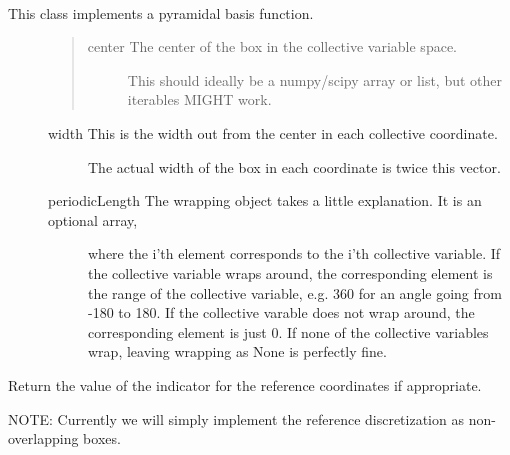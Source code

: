 \documentclass[letterpaper,10pt,english]{sphinxmanual}
\begin{document}
\begin{fulllineitems}
\label{applications/applications.doc:basisFunctions.Pyramid}~\begin{description}
\item[{This class implements a pyramidal basis function. }] \leavevmode\begin{quote}
\begin{description}
\item[{center            The center of the box in the collective variable space.  }] \leavevmode
This should ideally be a numpy/scipy array or list, but other iterables MIGHT work.

\end{description}
\end{quote}
\begin{description}
\item[{width              This is the width out from the center in each collective coordinate.}] \leavevmode
The actual width of the box in each coordinate is twice this vector.

\item[{periodicLength        The wrapping object takes a little explanation.  It is an optional array, }] \leavevmode
where the i'th element corresponds to the i'th collective variable.  If the 
collective variable wraps around, the corresponding element is the range 
of the collective variable, e.g. 360 for an angle going from -180 to 180.  If the 
collective varable does not wrap around, the corresponding element is 
just 0.  If none of the collective variables 
wrap, leaving wrapping as None is perfectly fine.

\end{description}

\end{description}

\begin{fulllineitems}
\label{applications/applications.doc:basisFunctions.Pyramid.ref_indicator}
Return the value of the indicator for the reference coordinates if appropriate.

NOTE: Currently we will simply implement the reference discretization as non-overlapping boxes.


\end{fulllineitems}
\end{fulllineitems}
\end{document}
